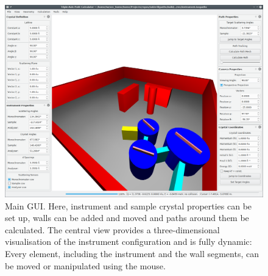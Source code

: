 \begin{figure}[htb]
		\begin{center}
			\includegraphics[width = 1 \textwidth]{figures/gui}
		\end{center}
	\caption{Main GUI. Here, instrument and sample crystal properties can be set up,
		walls can be added and moved and paths around them be calculated.
		The central view provides a three-dimensional visualisation of the instrument
		configuration and is fully dynamic: Every element, including the instrument
		and the wall segments, can be moved or manipulated using the mouse.
		\label{fig:gui}}
\end{figure}




